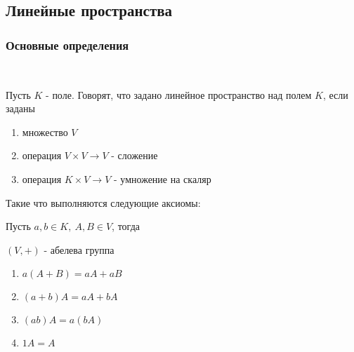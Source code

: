 \subsection{Линейные пространства}

\subsubsection{Основные определения}

\begin{defn}~
    
    Пусть $K$ - поле. Говорят, что задано линейное пространство над полем $K$, если заданы

    \begin{enumerate}
        \item множество $V$ 
        \item операция $V \times V \to V$ - сложение 
        \item операция $K \times V \to V$ - умножение на скаляр 
    \end{enumerate}

    Такие что выполняются следующие аксиомы:

    Пусть $a, b \in K, ~ A, B \in V$, тогда

    $(V, +)$ - абелева группа
    \begin{enumerate}
        \item $a(A + B) = aA + aB$
        \item $(a + b)A = aA + bA$
        \item $(ab)A = a(bA)$
        \item $1A = A$
    \end{enumerate}

\end{defn}


